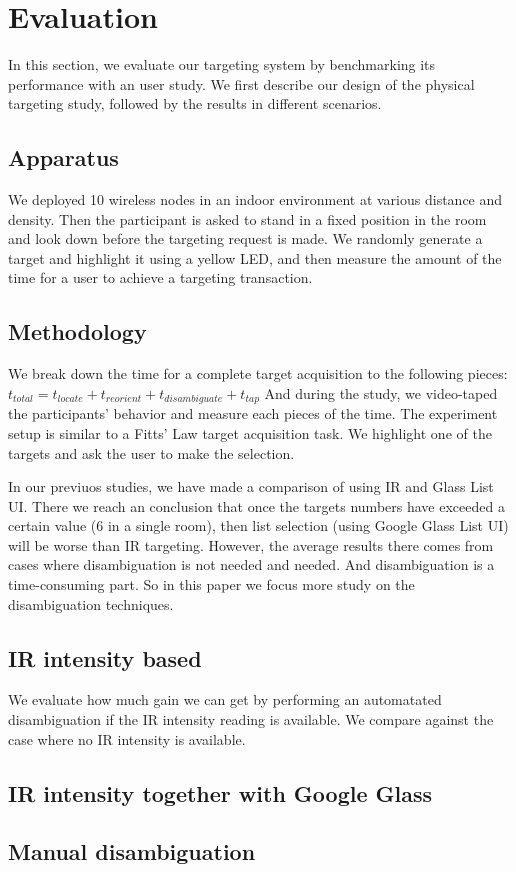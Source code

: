 \section{Evaluation}
\label{sec:evaluation}

In this section, we evaluate our targeting system by benchmarking its performance with an user study. We first describe our design of the physical targeting study, followed by the results in different scenarios.

\subsection{Apparatus}
We deployed 10 wireless nodes in an indoor environment at various distance and density. Then the participant is asked to stand in a fixed position in the room and look down before the targeting request is made. We randomly generate a target and highlight it using a yellow LED, and then measure the amount of the time for a user to achieve a targeting transaction. 

\subsection{Methodology}
\label{sec:methodology}

We break down the time for a complete target acquisition to the following pieces:
$t_{total}=t_{locate}+t_{reorient}+t_{disambiguate}+t_{tap}$
And during the study, we video-taped the participants' behavior and measure each pieces of the time. The experiment setup is similar to a Fitts' Law target acquisition task. We highlight one of the targets and ask the user to make the selection.

In our previuos studies, we have made a comparison of using IR and Glass List UI. There we reach an conclusion that once the targets numbers have exceeded a certain value (6 in a single room), then list selection (using Google Glass List UI) will be worse than IR targeting. However, the average results there comes from cases where disambiguation is not needed and needed. And disambiguation is a time-consuming part. So in this paper we focus more study on the disambiguation techniques.


\subsection{IR intensity based}
We evaluate how much gain we can get by performing an automatated disambiguation if the IR intensity reading is available. We compare against the case where no IR intensity is available. 

\subsection{IR intensity together with Google Glass}

\subsection{Manual disambiguation}



